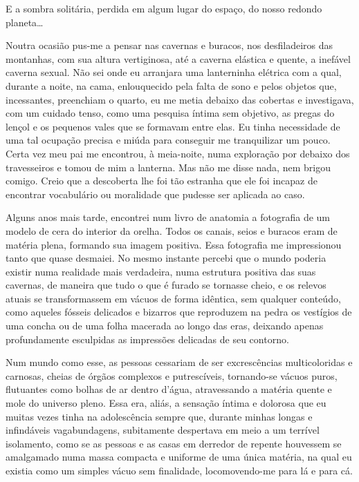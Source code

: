 E a sombra solitária, perdida em algum lugar do espaço, do nosso redondo planeta\dots

Noutra ocasião pus-me a pensar nas cavernas e buracos, nos desfiladeiros das montanhas, com sua altura vertiginosa, até a caverna elástica e quente, a inefável caverna sexual. Não sei onde eu arranjara uma lanterninha elétrica com a qual, durante a noite, na cama, enlouquecido pela falta de sono e pelos objetos que, incessantes, preenchiam o quarto, eu me metia debaixo das cobertas e investigava, com um cuidado tenso, como uma pesquisa íntima sem objetivo, as pregas do lençol e os pequenos vales que se formavam entre elas. Eu tinha necessidade de uma tal ocupação precisa e miúda para conseguir me tranquilizar um pouco. Certa vez meu pai me encontrou, à meia-noite, numa exploração por debaixo dos travesseiros e tomou de mim a lanterna. Mas não me disse nada, nem brigou comigo. Creio que a descoberta lhe foi tão estranha que ele foi incapaz de encontrar vocabulário ou moralidade que pudesse ser aplicada ao caso.

Alguns anos mais tarde, encontrei num livro de anatomia a fotografia de um modelo de cera do interior da orelha. Todos os canais, seios e buracos eram de matéria plena, formando sua imagem positiva. Essa fotografia me impressionou tanto que quase desmaiei. No mesmo instante percebi que o mundo poderia existir numa realidade mais verdadeira, numa estrutura positiva das suas cavernas, de maneira que tudo o que é furado se tornasse cheio, e os relevos atuais se transformassem em vácuos de forma idêntica, sem qualquer conteúdo, como aqueles fósseis delicados e bizarros que reproduzem na pedra os vestígios de uma concha ou de uma folha macerada ao longo das eras, deixando apenas profundamente esculpidas as impressões delicadas de seu contorno.

Num mundo como esse, as pessoas cessariam de ser excrescências multicoloridas e carnosas, cheias de órgãos complexos e putrescíveis, tornando-se vácuos puros, flutuantes como bolhas de ar dentro d’água, atravessando a matéria quente e mole do universo pleno. Essa era, aliás, a sensação íntima e dolorosa que eu muitas vezes tinha na adolescência sempre que, durante minhas longas e infindáveis vagabundagens, subitamente despertava em meio a um terrível isolamento, como se as pessoas e as casas em derredor de repente houvessem se amalgamado numa massa compacta e uniforme de uma única matéria, na qual eu existia como um simples vácuo sem finalidade, locomovendo-me para lá e para cá.


